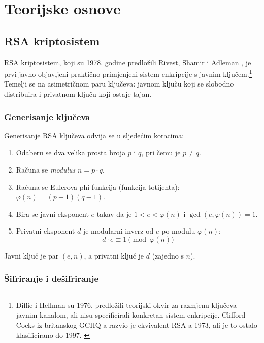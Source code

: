 
\chapter{Teorijske osnove}
\label{ch:teorija}

\section{RSA kriptosistem}

RSA kriptosistem, koji su 1978. godine predložili Rivest, Shamir i Adleman \cite{rivest1978}, je prvi javno objavljeni praktično primjenjeni sistem enkripcije s javnim ključem.\footnote{Diffie i Hellman su 1976. predložili teorijski okvir za razmjenu ključeva javnim kanalom, ali nisu specificirali konkretan sistem enkripcije. Clifford Cocks iz britanskog GCHQ-a razvio je ekvivalent RSA-a 1973, ali je to ostalo klasificirano do 1997. \cite{cocks1973}} Temelji se na asimetričnom paru ključeva: javnom ključu koji se slobodno distribuira i privatnom ključu koji ostaje tajan.

\subsection{Generisanje ključeva}

Generisanje RSA ključeva odvija se u sljedećim koracima:

\begin{enumerate}
\item Odaberu se dva velika prosta broja $p$ i $q$, pri čemu je $p \neq q$.
\item Računa se \textit{modulus} $n = p \cdot q$.
\item Računa se Eulerova phi-funkcija (funkcija totijenta): $\varphi(n) = (p-1)(q-1)$.
\item Bira se javni eksponent $e$ takav da je $1 < e < \varphi(n)$ i $\gcd(e, \varphi(n)) = 1$.
\item Privatni eksponent $d$ je modularni inverz od $e$ po modulu $\varphi(n)$:
\begin{equation}
d \cdot e \equiv 1 \pmod{\varphi(n)}
\label{eq:privatekey}
\end{equation}
\end{enumerate}

Javni ključ je par $(e, n)$, a privatni ključ je $d$ (zajedno s $n$).

\subsection{Šifriranje i dešifriranje}

